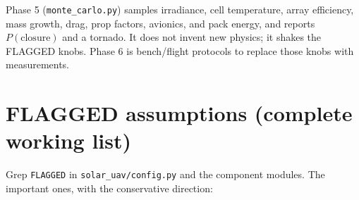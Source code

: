 \documentclass[11pt,letterpaper]{article}
\newcommand{\code}[1]{\texttt{#1}}
\begin{document}
Phase 5 (\code{monte\_carlo.py}) samples irradiance, cell temperature, array efficiency, mass growth, drag, prop factors, avionics, and pack energy, and reports $P(\mathrm{closure})$ and a tornado. It does not invent new physics; it shakes the FLAGGED knobs. Phase 6 is bench/flight protocols to replace those knobs with measurements.

\section{FLAGGED assumptions (complete working list)}

Grep \texttt{FLAGGED} in \code{solar\_uav/config.py} and the component modules. The important ones, with the conservative direction:
\end{document}
